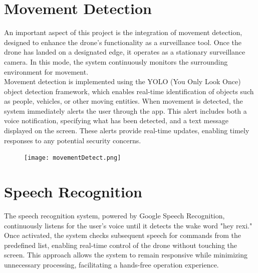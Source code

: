\documentclass[unnumsec,webpdf,modern,large]{mam-authoring-template}%
\begin{document}
\section{Movement Detection}
An important aspect of this project is the integration of movement detection, designed to enhance the drone’s functionality as a surveillance tool. Once the drone has landed on a designated edge, it operates as a stationary surveillance camera. In this mode, the system continuously monitors the surrounding environment for movement.\\
Movement detection is implemented using the YOLO (You Only Look Once) object detection framework, which enables real-time identification of objects such as people, vehicles, or other moving entities. When movement is detected, the system immediately alerts the user through the app. This alert includes both a voice notification, specifying what has been detected, and a text message displayed on the screen. These alerts provide real-time updates, enabling timely responses to any potential security concerns.

\begin{figure}[H]
    \centering
    \texttt{[image: movementDetect.png]}  %
    \label{fig:movementDetect.}
\end{figure}

\section{Speech Recognition} \label{sec:SpeechRecognition}
The speech recognition system, powered by Google Speech Recognition, continuously listens for the user’s voice until it detects the wake word "hey rexi." Once activated, the system checks subsequent speech for commands from the predefined list, enabling real-time control of the drone without touching the screen. This approach allows the system to remain responsive while minimizing unnecessary processing, facilitating a hands-free operation experience.
\end{document}
